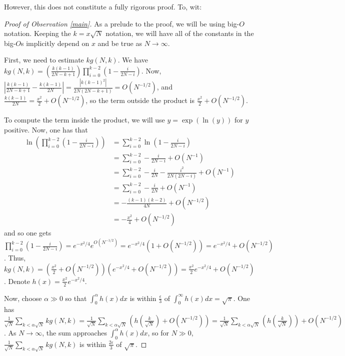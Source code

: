 \documentclass[11pt]{article}
\theoremstyle{definition}
\begin{document}
However, this does not constitute a fully rigorous proof.  To, wit:
\begin{proof}[Proof of Observation \ref{main}]
As a prelude to the proof, we will be using big-$O$ notation.  Keeping the $k = x\sqrt{N}$ notation, we will have all of the constants in the big-$O$s implicitly depend on $x$ and be true as $N \rightarrow \infty$.

First, we need to estimate $kg(N,k)$.  We have $kg(N,k) = \left(\frac{k(k-1)}{2N-k+1}\right)\prod_{i = 0}^{k-2}\left(1-\frac{i}{2N-i}\right)$.  Now, $\left|\frac{k(k-1)}{2N-k+1} - \frac{k(k-1)}{2N}\right| = \frac{|k(k-1)^2|}{2N(2N-k+1)} = O(N^{-1/2})$, and $\frac{k(k-1)}{2N} = \frac{x^2}{2} + O(N^{-1/2})$, so the term outside the product is $\frac{x^2}{2} + O(N^{-1/2})$.

To compute the term inside the product, we will use $y = \exp(\ln(y))$ for $y$ positive.  Now, one has that
\begin{align*}
\ln\left(\prod_{i = 0}^{k-2}\left(1-\frac{i}{2N-i}\right)\right) & = \sum_{i=0}^{k-2}\ln\left(1-\frac{i}{2N-i}\right) \\
& = \sum_{i=0}^{k-2} -\frac{i}{2N-i} + O(N^{-1}) \\
& = \sum_{i=0}^{k-2} -\frac{i}{2N} - \frac{i^2}{2N(2N-i)} + O(N^{-1}) \\
& = \sum_{i=0}^{k-2} -\frac{i}{2N} + O(N^{-1})\\
& = -\frac{(k-1)(k-2)}{4N} + O(N^{-1/2}) \\
& = -\frac{x^2}{4} + O(N^{-1/2})
\end{align*}
and so one gets $\prod_{i = 0}^{k-2}\left(1-\frac{i}{2N-i}\right) = e^{-x^2/4}e^{O(N^{-1/2})} = e^{-x^2/4}(1+O(N^{-1/2})) = e^{-x^2/4} + O(N^{-1/2})$.  Thus, $kg(N,k) = (\frac{x^2}{2} + O(N^{-1/2}))(e^{-x^2/4} + O(N^{-1/2})) = \frac{x^2}{2}e^{-x^2/4} + O(N^{-1/2})$.  Denote $h(x) = \frac{x^2}{2}e^{-x^2/4}$.

Now, choose $\alpha \gg 0$ so that $\int_{0}^\alpha h(x)dx$ is within $\frac{\epsilon}{3}$ of $\int_0^\infty h(x)dx = \sqrt{\pi}$.  One has $\frac{1}{\sqrt{N}}\displaystyle{\sum_{k < \alpha\sqrt{N}}}kg(N,k) = \frac{1}{\sqrt{N}}\displaystyle{\sum_{k <\alpha\sqrt{N}}}\left(h\left(\frac{k}{\sqrt{N}}\right) + O(N^{-1/2})\right) = \frac{1}{\sqrt{N}}\displaystyle{\sum_{k <\alpha\sqrt{N}}}\left(h\left(\frac{k}{\sqrt{N}}\right)\right) + O(N^{-1/2})$.  As $N\rightarrow \infty$, the sum approaches $\int_{0}^\alpha h(x)dx$, so for $N \gg 0$, $\frac{1}{\sqrt{N}}\displaystyle{\sum_{k < \alpha\sqrt{N}}}kg(N,k)$ is within $\frac{2\epsilon}{3}$ of $\sqrt{\pi}$.


\end{proof}
\end{document}
